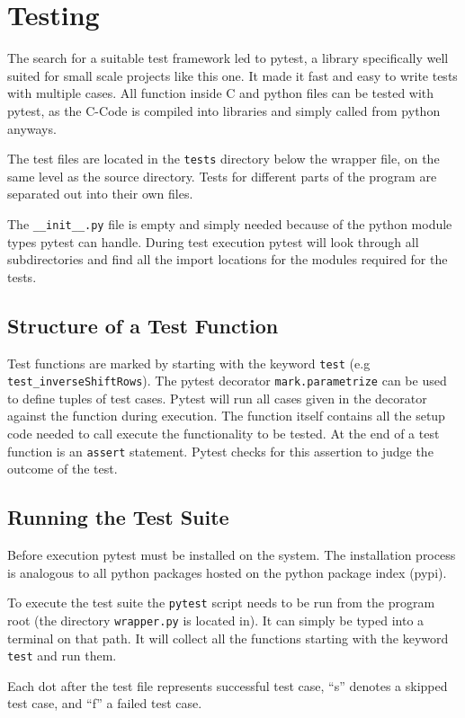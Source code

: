 \section{Testing}
The search for a suitable test framework led to pytest, a library specifically well suited for small scale projects like this one. It made it fast and easy to write tests with multiple cases. All function inside C and python files can be tested with pytest, as the C-Code is compiled into libraries and simply called from python anyways. \cite{pytest}

The test files are located in the \lstinline|tests| directory below the wrapper file, on the same level as the source directory. Tests for different parts of the program are separated out into their own files.

The \lstinline|__init__.py| file is empty and simply needed because of the python module types pytest can handle. During test execution pytest will look through all subdirectories and find all the import locations for the modules required for the tests.

\subsection{Structure of a Test Function}
Test functions are marked by starting with the keyword \lstinline|test| (e.g \lstinline|test_inverseShiftRows|). The pytest decorator \lstinline|mark.parametrize| can be used to define tuples of test cases. Pytest will run all cases given in the decorator against the function during execution. The function itself contains all the setup code needed to call execute the functionality to be tested. At the end of a test function is an \lstinline|assert| statement. Pytest checks for this assertion to judge the outcome of the test. 


\subsection{Running the Test Suite}
Before execution pytest must be installed on the system. The installation process is analogous to all python packages hosted on the python package index (pypi).

To execute the test suite the \lstinline|pytest| script needs to be run from the program root (the directory \lstinline|wrapper.py| is located in). It can simply be typed into a terminal on that path. It will collect all the functions starting with the keyword \lstinline|test| and run them.

Each dot after the test file represents successful test case, \enquote{s} denotes a skipped test case, and \enquote{f} a failed test case.
